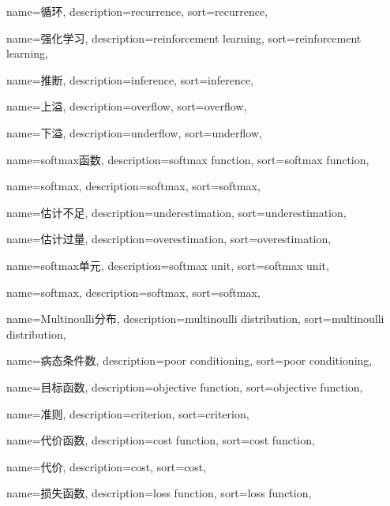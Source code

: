 {
  name=循环,
  description={recurrence},
  sort={recurrence},
}

{
  name=强化学习,
  description={reinforcement learning},
  sort={reinforcement learning},
}

{
  name=推断,
  description={inference},
  sort={inference},
}

{
  name=上溢,
  description={overflow},
  sort={overflow},
}

{
  name=下溢,
  description={underflow},
  sort={underflow},
}

{
  name=softmax函数,
  description={softmax function},
  sort={softmax function},
}

{
  name=softmax,
  description={softmax},
  sort={softmax},
}

{
  name=估计不足,
  description={underestimation},
  sort={underestimation},
}

{
  name=估计过量,
  description={overestimation},
  sort={overestimation},
}

{
  name=softmax单元,
  description={softmax unit},
  sort={softmax unit},
}

{
  name=softmax,
  description={softmax},
  sort={softmax},
}

{
  name=Multinoulli分布,
  description={multinoulli distribution},
  sort={multinoulli distribution},
}

{
  name=病态条件数,
  description={poor conditioning},
  sort={poor conditioning},
}

{
  name=目标函数,
  description={objective function},
  sort={objective function},
}

{
  name=准则,
  description={criterion},
  sort={criterion},
}

{
  name=代价函数,
  description={cost function},
  sort={cost function},
}

{
	name=代价,
	description={cost},
	sort={cost},
}

{
  name=损失函数,
  description={loss function},
  sort={loss function},
}

